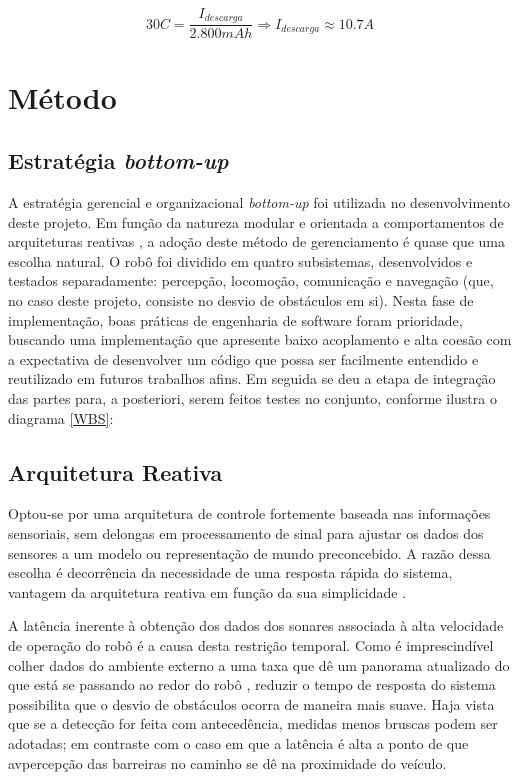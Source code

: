 \begin{equation}
 \label{C rate}
 30 C = \frac{ I_{descarga} }{ 2.800 mAh} \Rightarrow I_{descarga} \approx 10.7A
\end{equation}



\chapter{Método}
\section{Estratégia \textit{bottom-up}}
A estratégia gerencial e organizacional \textit{bottom-up} foi utilizada no desenvolvimento deste projeto. 
Em função da natureza modular e orientada a comportamentos de arquiteturas reativas \cite{murphy}, a adoção deste método de gerenciamento é quase que 
uma escolha natural.
O robô foi dividido em quatro subsistemas, desenvolvidos e testados separadamente: percepção, locomoção, comunicação e navegação (que, no caso deste 
projeto, consiste no desvio de obstáculos em si). %
Nesta fase de implementação,  boas práticas de engenharia de software foram prioridade, buscando uma implementação que 
apresente baixo acoplamento  e alta coesão com a expectativa de desenvolver um código que possa ser facilmente entendido e reutilizado em futuros 
trabalhos afins.
Em seguida se deu a etapa de integração das partes para, a posteriori, serem feitos testes no conjunto, conforme ilustra o diagrama \ref{WBS}:

\section{Arquitetura Reativa} 

Optou-se por uma arquitetura de controle fortemente baseada nas informações sensoriais, sem delongas em processamento de sinal para ajustar os dados 
dos sensores a um modelo ou representação de mundo preconcebido. 
A razão dessa escolha é decorrência da necessidade de uma resposta rápida do sistema, vantagem da arquitetura reativa em função da sua simplicidade 
\cite{roseli}.

A latência inerente à obtenção dos dados dos sonares \cite{jones} associada à alta velocidade de operação do robô é a causa desta restrição 
temporal. %
Como é imprescindível colher dados do ambiente externo a uma taxa que dê um panorama atualizado do que está se passando ao redor do robô 
\cite{brooks}, reduzir o tempo de resposta do sistema possibilita que o desvio de obstáculos ocorra de maneira mais suave.
Haja vista que se a detecção for feita com antecedência, medidas menos bruscas podem ser adotadas; em contraste com o caso em que a latência é alta a 
ponto de que avpercepção das barreiras no caminho se dê na proximidade do veículo.

